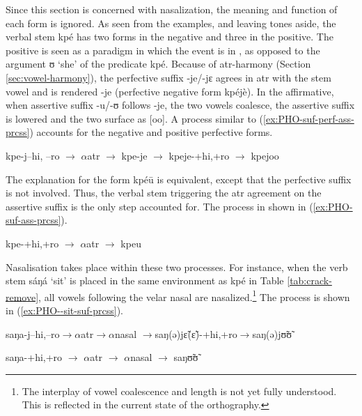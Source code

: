 Since this section is concerned with nasalization, the meaning and function of each form is ignored. As seen from the examples, and leaving tones aside, the verbal stem {\sls kpé} has two forms in the negative and three in the positive. The positive is seen as a paradigm in which the event is in , as opposed to the argument {\sls ʊ} `she' of the predicate {\sls kpé}. Because of {\sc atr}-harmony (Section \ref{sec:vowel-harmony}), the perfective suffix {\sls -je/-jɛ} agrees in {\sc atr} with the stem vowel and is rendered {\sls -je} (perfective negative form {\sls kpéjè}). In the affirmative,  when assertive suffix  {\sls -u/-ʊ}  follows {\sls  -je}, the two vowels coalesce, the assertive suffix is lowered and the two  surface as [{oo}]. A process similar to (\ref{ex:PHO-suf-perf-ass-prcss})  accounts for the negative and positive perfective forms.

\begin{exe}
\ex\label{ex:PHO-suf-perf-ass-prcss}
kpe-j{\ob}{\sc  --hi, --ro}{\cb}  $\rightarrow$  $\alpha${\sc atr} $\rightarrow$ kpe-je 
 $\rightarrow$
kpeje-{\ob}{\sc +hi,+ro}{\cb}  $\rightarrow$  kpejoo
\end{exe}

The explanation for the form {\sls kpéū} is equivalent, except that the
perfective suffix is not involved. Thus,  the verbal stem triggering the {\sc
atr} agreement on the assertive suffix is the only step  accounted
for. The process in shown in (\ref{ex:PHO-suf-ass-prcss}).


\begin{exe}
\ex\label{ex:PHO-suf-ass-prcss}
kpe-{\ob}{\sc +hi,+ro}{\cb}  $\rightarrow$  $\alpha${\sc atr} $\rightarrow$ kpeu
\end{exe}


Nasalisation takes place within these two processes. For instance, when the verb stem {\sls sáŋá} `sit' is placed in the same environment as {\sls kpé} in Table \ref{tab:crack-remove}, all vowels following the velar nasal are nasalized.\footnote{The interplay of vowel coalescence and  length is not yet fully understood. This is reflected in the current state of the orthography.}  The process is shown in (\ref{ex:PHO--sit-suf-prcss}).

\begin{exe}
\ex\label{ex:PHO--sit-suf-prcss}
\begin{xlist}

\ex\label{ex:PHO-sit-suf-perf-ass-prcss}
 saŋa-j{\ob}{\sc  --hi,--ro}{\cb}$\rightarrow\!\alpha${\sc atr}$\rightarrow\!\alpha${\sc nasal}
$\rightarrow$saŋ(ə)jɛ̃(ɛ̃)-{\ob}{\sc +hi,+ro}{\cb}$\rightarrow$saŋ(ə)jʊ̃ʊ̃

\ex\label{ex:PHO--sit-suf-ass-prcss}
saŋa-{\ob}{\sc +hi,+ro}{\cb}   $\rightarrow$  $\alpha${\sc atr}  $\rightarrow$  
$\alpha${\sc nasal} $\rightarrow$ saŋʊ̃ʊ̃
\end{xlist}
\end{exe}

